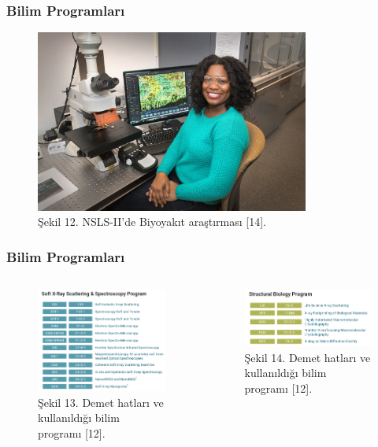 \documentclass[aspectratio=169,10pt]{beamer}
\begin{document}
\begin{frame}[allowframebreaks]
\frametitle{Bilim Programları}

		\begin{figure}[h!]
 \centering
\includegraphics[width=9cm]{33696668366_c810eac721_k.jpg}
\caption*{Şekil 12. NSLS-II'de Biyoyakıt araştırması [14].}
	\end{figure}
	

\end{frame}

\begin{frame}[allowframebreaks]
\frametitle{Bilim Programları}

\begin{columns}

		\begin{figure}[h!]
 \centering
\includegraphics[width=7cm]{program1-1.png}
\caption*{Şekil 13. Demet hatları ve kullanıldığı bilim programı [12].}
\end{figure}
 
\centering
		\begin{figure}[h!]
 \centering
\includegraphics[width=7cm]{program1-2.png}
\caption*{Şekil 14. Demet hatları ve kullanıldığı bilim programı [12].}
\end{figure}
	\end{columns}
\end{frame}
\end{document}
